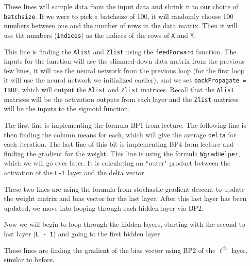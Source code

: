 \documentclass[12pt,letterpaper]{article}
\begin{document}
\begin{enumerate}


These lines will sample data from the input data and shrink it to our choice of \texttt{batchsize}. If we were to pick a batchsize of 100, it will randomly choose 100 numbers between one and the number of rows in the data matrix. Then it will use tht numbers (\texttt{indices}) as the indices of the rows of \texttt{X} and \texttt{Y}.



This line is finding the \texttt{Alist} and \texttt{Zlist} using the \texttt{feedForward} function. The inputs for the function will use the slimmed-down data matrix from the previous few lines, it will use the neural network from the previous loop (for the first loop it will use the neural network we initialized earlier), and we set \texttt{backPropagate = TRUE}, which will output the \texttt{Alist} and \texttt{Zlist} matrices. Recall that the \texttt{Alist} matrices will be the activation outputs from each layer and the \texttt{Zlist} matrices will be the inputs to the sigmoid function.



The first line is implementing the formula BP1 from lecture. The following line is then finding the column means for each, which will give the average \texttt{delta} for each iteration. The last line of this bit is implementing BP4 from lecture and finding the gradient for the weight. This line is using the formula \texttt{WgradHelper}, which we will go over later. It is calculating an ``outer" product between the activation of the \texttt{L-1} layer and the delta vector.



These two lines are using the formula from stochastic gradient descent to update the weight matrix and bias vector for the last layer. After this last layer has been updated, we move into looping through each hidden layer via BP2.



Now we will begin to loop through the hidden layers, starting with the second to last layer (\texttt{L - 1}) and going to the first hidden layer.



These lines are finding the gradient of the bias vector using BP2 of the $\ell^{\text{th}}$ layer, similar to before.


\end{enumerate}
\end{document}
